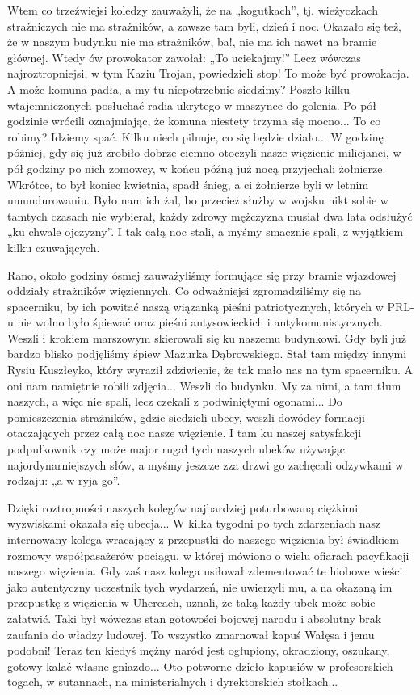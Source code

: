 Wtem co trzeźwiejsi koledzy zauważyli, że na „kogutkach”, tj. wieżyczkach strażniczych nie ma strażników, a zawsze tam byli, dzień i noc. Okazało się też, że w naszym budynku nie ma strażników, ba!, nie ma ich nawet na bramie głównej. Wtedy ów prowokator zawołał: „To uciekajmy!” Lecz wówczas najroztropniejsi, w tym Kaziu Trojan, powiedzieli stop! To może być prowokacja. A może komuna padła, a my tu niepotrzebnie siedzimy? Poszło kilku wtajemniczonych posłuchać radia ukrytego w maszynce do golenia. Po pół godzinie wrócili oznajmiając, że komuna niestety trzyma się mocno... To co robimy? Idziemy spać. Kilku niech pilnuje, co się będzie działo... W godzinę później, gdy się już zrobiło dobrze ciemno otoczyli nasze więzienie milicjanci, w pół godziny po nich zomowcy, w końcu późną już nocą przyjechali żołnierze. Wkrótce, to był koniec kwietnia, spadł śnieg, a ci żołnierze byli w letnim umundurowaniu. Było nam ich żal, bo przecież służby w wojsku nikt sobie w tamtych czasach nie wybierał, każdy zdrowy mężczyzna musiał dwa lata odsłużyć „ku chwale ojczyzny”. I tak całą noc stali, a myśmy smacznie spali, z wyjątkiem kilku czuwających.

Rano, około godziny ósmej zauważyliśmy formujące się przy bramie wjazdowej oddziały strażników więziennych. Co odważniejsi zgromadziliśmy się na spacerniku, by ich powitać naszą wiązanką pieśni patriotycznych, których w PRL-u nie wolno było śpiewać oraz pieśni antysowieckich i antykomunistycznych. Weszli i krokiem marszowym skierowali się ku naszemu budynkowi. Gdy byli już bardzo blisko podjęliśmy śpiew Mazurka Dąbrowskiego. Stał tam między innymi Rysiu Kuszłeyko, który wyraził zdziwienie, że tak mało nas na tym spacerniku. A oni nam namiętnie robili zdjęcia... Weszli do budynku. My za nimi, a tam tłum naszych, a więc nie spali, lecz czekali z podwiniętymi ogonami... Do pomieszczenia strażników, gdzie siedzieli ubecy, weszli dowódcy formacji otaczających przez całą noc nasze więzienie. I tam ku naszej satysfakcji podpułkownik czy może major rugał tych naszych ubeków używając najordynarniejszych słów, a myśmy jeszcze zza drzwi go zachęcali odzywkami w rodzaju: „a w ryja go”. 

Dzięki roztropności naszych kolegów najbardziej poturbowaną ciężkimi wyzwiskami okazała się ubecja... W kilka tygodni po tych zdarzeniach nasz internowany kolega wracający z przepustki do naszego więzienia był świadkiem rozmowy współpasażerów pociągu, w której mówiono o wielu ofiarach pacyfikacji naszego więzienia. Gdy zaś nasz kolega usiłował zdementować te hiobowe wieści jako autentyczny uczestnik tych wydarzeń, nie uwierzyli mu, a na okazaną im przepustkę z więzienia w Uhercach, uznali, że taką każdy ubek może sobie załatwić. Taki był wówczas stan gotowości bojowej narodu i absolutny brak zaufania do władzy ludowej. To wszystko zmarnował kapuś Wałęsa i jemu podobni! Teraz ten kiedyś mężny naród jest ogłupiony, okradziony, oszukany, gotowy kalać własne gniazdo... Oto potworne dzieło kapusiów w profesorskich togach, w sutannach, na ministerialnych i dyrektorskich stołkach...

